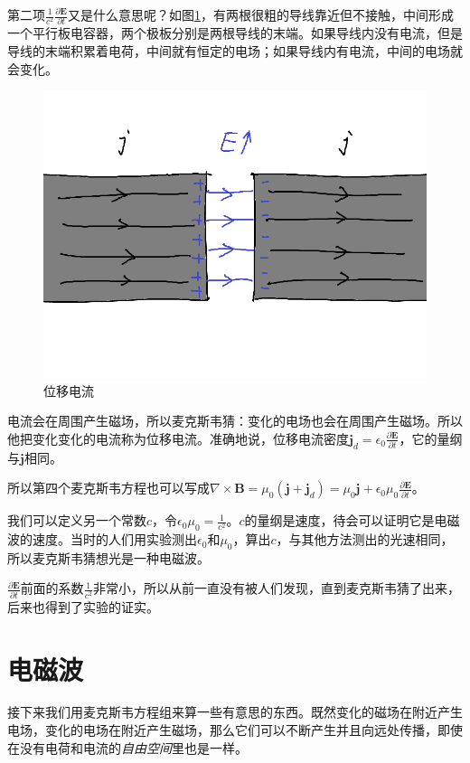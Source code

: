 第二项$\frac{1}{c^2} \frac{\partial \mathbf{E}}{\partial t}$又是什么意思呢？如图\ref{fig-disp-curr}，有两根很粗的导线靠近但不接触，中间形成一个平行板电容器，两个极板分别是两根导线的末端。如果导线内没有电流，但是导线的末端积累着电荷，中间就有恒定的电场；如果导线内有电流，中间的电场就会变化。
\begin{figure}[htb]
\centering
\includegraphics[scale=0.5]{fig/disp-curr}
\caption{位移电流}
\label{fig-disp-curr}
\end{figure}

电流会在周围产生磁场，所以麦克斯韦猜：变化的电场也会在周围产生磁场。所以他把变化变化的电流称为位移电流。准确地说，位移电流密度$\mathbf{j}_d=\epsilon_0 \frac{\partial \mathbf{E}}{\partial t}$，它的量纲与$\mathbf{j}$相同。

所以第四个麦克斯韦方程也可以写成$\nabla \times \mathbf{B}=\mu_0 (\mathbf{j}+\mathbf{j}_d)=\mu_0 \mathbf{j}+\epsilon_0 \mu_0 \frac{\partial \mathbf{E}}{\partial t}$。

我们可以定义另一个常数$c$，令$\epsilon_0 \mu_0=\frac{1}{c^2}$。$c$的量纲是速度，待会可以证明它是电磁波的速度。当时的人们用实验测出$\epsilon_0$和$\mu_0$，算出$c$，与其他方法测出的光速相同，所以麦克斯韦猜想光是一种电磁波。

$\frac{\partial \mathbf{E}}{\partial t}$前面的系数$\frac{1}{c^2}$非常小，所以从前一直没有被人们发现，直到麦克斯韦猜了出来，后来也得到了实验的证实。
\section{电磁波}
接下来我们用麦克斯韦方程组来算一些有意思的东西。既然变化的磁场在附近产生电场，变化的电场在附近产生磁场，那么它们可以不断产生并且向远处传播，即使在没有电荷和电流的\emph{自由空间}里也是一样。


